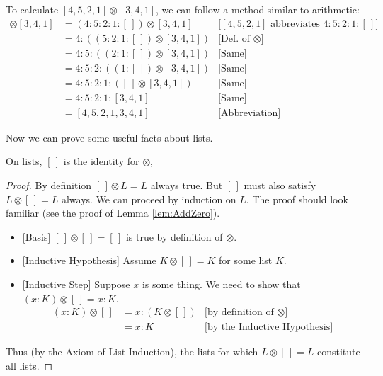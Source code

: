 \begin{example}
  To calculate $[4,5,2,1] \otimes [3,4,1]$, we can follow a method similar to arithmetic:
  \begin{align*}
    [4,5,2,1]\otimes[3,4,1] &= (4:5:2:1:[\,])\otimes[3,4,1] & \text{[$[4,5,2,1]$ abbreviates $4:5:2:1:[\,]$]}\\
                    &= 4:((5:2:1:[\,])\otimes[3,4,1]) &\text{[Def. of $\otimes$]}\\
                    &= 4:5:((2:1:[\,])\otimes[3,4,1]) & \text{[Same]}\\
                    &= 4:5:2:((1:[\,])\otimes[3,4,1]) &\text{[Same]}\\
                    &= 4:5:2:1:([\,]\otimes[3,4,1])  &\text{[Same]}\\
                    &= 4:5:2:1:[3,4,1] &\text{[Same]}\\
                    &= [4,5,2,1,3,4,1]                &\text{[Abbreviation]}
  \end{align*}
\end{example}

\ipadbreak
Now we can prove some useful facts about lists.

\begin{lemma}
  On lists, $[\,]$ is the identity for $\otimes$,

\begin{proof}
  By definition
  $[\,]\otimes L = L$ always true.  But $[\,]$ must also 
  satisfy
  $L\otimes[\,] = L$ always. We can proceed by
  induction on $L$. The proof should look familiar (see the proof of
  Lemma \ref{lem:AddZero}).

  \begin{itemize}
  \item{}[Basis] $[\,]\otimes [\,] = [\,]$ is true by definition of
    $\otimes$.
  \item{}[Inductive Hypothesis] Assume $K\otimes[\,] = K$ for some list
    $K$.
  \item{}[Inductive Step]  Suppose $x$ is some thing. We need to show that $(x:K) \otimes [\,] = x:K$. 
    \begin{align*}
       (x:K)\otimes [\,] &= x:(K\otimes[\,]) &\text{[by definition of $\otimes$]}\\
	                   &= x:K &\text{[by the Inductive Hypothesis]}   	
    \end{align*}
  \end{itemize}
  Thus (by the Axiom of List Induction), the lists for which $L\otimes [\,] = L$ constitute all lists.
\end{proof}
\end{lemma}


